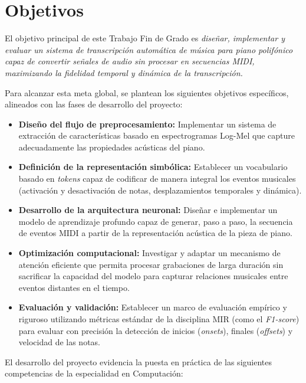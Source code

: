 \section{Objetivos}
\label{sec:objetivos}

El objetivo principal de este Trabajo Fin de Grado es \textit{diseñar, implementar y evaluar un sistema de transcripción automática de música para piano polifónico capaz de convertir señales de audio sin procesar en secuencias MIDI, maximizando la fidelidad temporal y dinámica de la transcripción.}

Para alcanzar esta meta global, se plantean los siguientes objetivos específicos, alineados con las fases de desarrollo del proyecto:

\begin{itemize}
\item \textbf{Diseño del flujo de preprocesamiento:} Implementar un sistema de extracción de características basado en espectrogramas Log-Mel que capture adecuadamente las propiedades acústicas del piano.

\item \textbf{Definición de la representación simbólica:} Establecer un vocabulario basado en \textit{tokens} capaz de codificar de manera integral los eventos musicales (activación y desactivación de notas, desplazamientos temporales y dinámica).

\item \textbf{Desarrollo de la arquitectura neuronal:} Diseñar e implementar un modelo de aprendizaje profundo capaz de generar, paso a paso, la secuencia de eventos MIDI a partir de la representación acústica de la pieza de piano.

\item \textbf{Optimización computacional:} Investigar y adaptar un mecanismo de atención eficiente que permita procesar grabaciones de larga duración sin sacrificar la capacidad del modelo para capturar relaciones musicales entre eventos distantes en el tiempo. 

\item \textbf{Evaluación y validación:} Establecer un marco de evaluación empírico y riguroso utilizando métricas estándar de la disciplina MIR (como el \textit{F1-score}) para evaluar con precisión la detección de inicios (\textit{onsets}), finales (\textit{offsets}) y velocidad de las notas.
\end{itemize}

\clearpage

El desarrollo del proyecto evidencia la puesta en práctica de las siguientes competencias de la especialidad en Computación:

